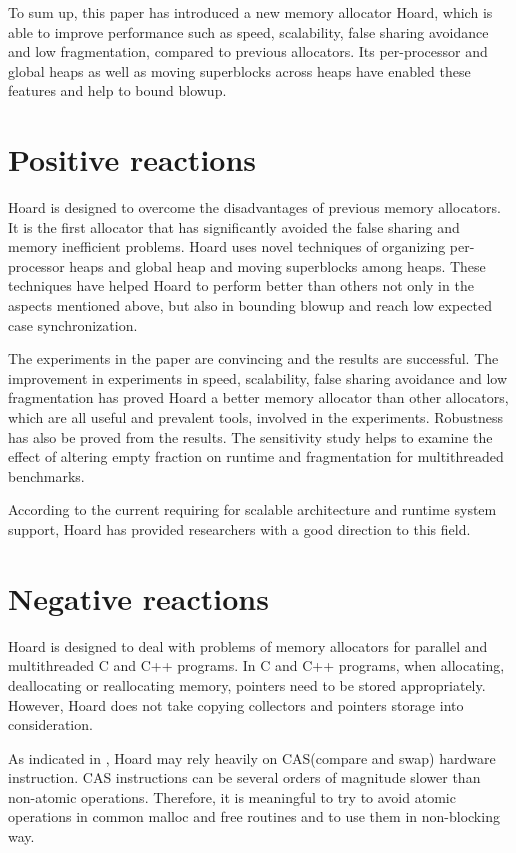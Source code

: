 \documentclass[10pt, letterpaper]{article}
\begin{document}
To sum up, this paper has introduced a new memory allocator Hoard, which is able to improve performance such as
speed, scalability, false sharing avoidance and low fragmentation, compared to previous allocators. Its
per-processor and global heaps as well as moving superblocks across heaps have enabled these features and help to
bound blowup.
\section{Positive reactions}
Hoard is designed to overcome the disadvantages of previous memory allocators. It is the first allocator that has significantly avoided the
false sharing and memory inefficient problems. Hoard uses novel techniques of organizing per-processor heaps and
global heap and moving superblocks among heaps. These techniques have helped Hoard to perform better than others
not only in the aspects mentioned above, but also in bounding blowup and reach low expected case synchronization.

The experiments in the paper are convincing and the results are successful. The improvement in experiments in speed,
scalability, false sharing avoidance and low fragmentation has proved Hoard a better memory allocator than other
allocators, which are all useful and prevalent tools, involved in the experiments. Robustness has also be proved
from the results. The sensitivity study helps to examine the effect of altering empty fraction on runtime and
fragmentation for multithreaded benchmarks.

According to the current requiring for scalable architecture and runtime system support, Hoard has provided
researchers with a good direction to this field.

\section{Negative reactions}
Hoard is designed to deal with problems of memory allocators for parallel and multithreaded C and C++ programs.
In C and C++ programs, when allocating, deallocating or reallocating memory, pointers need to be stored
appropriately. However, Hoard does not take copying collectors and pointers storage into consideration. 

As indicated in \cite{hudson2006mcrt}, Hoard may rely heavily on CAS(compare and swap) hardware instruction. CAS instructions
can be several orders of magnitude slower than non-atomic operations. Therefore, it is meaningful to try to avoid
atomic operations in common malloc and free routines and to use them in non-blocking way.
\end{document}
